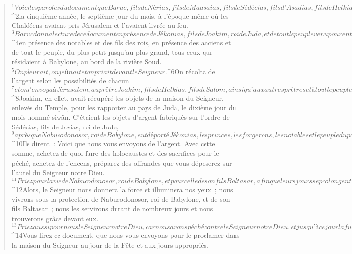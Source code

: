   
  
    
      
         
      \bchapter{}
      \begin{verse}
${}^{1}Voici les paroles du document que Baruc, fils de Nérias, fils de Maasaias, fils de Sédécias, fils d’Asadias, fils de Helkias, écrivit à Babylone, 
${}^{2}la cinquième année, le septième jour du mois, à l’époque même où les Chaldéens avaient pris Jérusalem et l’avaient livrée au feu. 
${}^{3}Baruc donna lecture de ce document en présence de Jékonias, fils de Joakim, roi de Juda, et de tout le peuple venu pour entendre le Livre, 
${}^{4}en présence des notables et des fils des rois, en présence des anciens et de tout le peuple, du plus petit jusqu’au plus grand, tous ceux qui résidaient à Babylone, au bord de la rivière Soud. 
${}^{5}On pleurait, on jeûnait et on priait devant le Seigneur. 
${}^{6}On récolta de l’argent selon les possibilités de chacun 
${}^{7}et on l’envoya à Jérusalem, au prêtre Joakim, fils de Helkias, fils de Salom, ainsi qu’aux autres prêtres et à tout le peuple, ceux qui se trouvaient avec lui à Jérusalem. 
${}^{8}Joakim, en effet, avait récupéré les objets de la maison du Seigneur, enlevés du Temple, pour les rapporter au pays de Juda, le dixième jour du mois nommé siwân. C’étaient les objets d’argent fabriqués sur l’ordre de Sédécias, fils de Josias, roi de Juda, 
${}^{9}après que Nabucodonosor, roi de Babylone, eut déporté Jékonias, les princes, les forgerons, les notables et le peuple du pays, de Jérusalem à Babylone.
${}^{10}Ils dirent : Voici que nous vous envoyons de l’argent. Avec cette somme, achetez de quoi faire des holocaustes et des sacrifices pour le péché, achetez de l’encens, préparez des offrandes que vous déposerez sur l’autel du Seigneur notre Dieu. 
${}^{11}Priez pour la vie de Nabucodonosor, roi de Babylone, et pour celle de son fils Baltasar, afin que leurs jours se prolongent aussi longtemps que le ciel demeurera au-dessus de la terre. 
${}^{12}Alors, le Seigneur nous donnera la force et illuminera nos yeux ; nous vivrons sous la protection de Nabucodonosor, roi de Babylone, et de son fils Baltasar ; nous les servirons durant de nombreux jours et nous trouverons grâce devant eux. 
${}^{13}Priez aussi pour nous le Seigneur notre Dieu, car nous avons péché contre le Seigneur notre Dieu, et jusqu’à ce jour la fureur et la colère du Seigneur ne se sont pas détournées de nous. 
${}^{14}Vous lirez ce document, que nous vous envoyons pour le proclamer dans la maison du Seigneur au jour de la Fête et aux jours appropriés. 

\end{verse}
